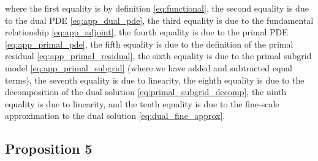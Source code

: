 %
where the first equality is by definition \eqref{eq:functional},
the second equality is due to the dual PDE
\eqref{eq:app_dual_pde}, the third equality is due to the
fundamental relationship \eqref{eq:app_adjoint},
the fourth equality is due to the primal PDE
\eqref{eq:app_primal_pde}, the fifth equality is due to
the definition of the primal residual \eqref{eq:app_primal_residual},
the sixth equality is due to the primal subgrid model
\eqref{eq:app_primal_subgrid} (where we have added and
subtracted equal terms), the seventh equality is due to
linearity, the eighth equality is due to the decomposition
of the dual solution \eqref{eq:primal_subgrid_decomp},
the ninth equality is due to linearity, and the tenth equality
is due to the fine-scale approximation to the dual solution
\eqref{eq:dual_fine_approx}.

\subsection{Proposition 5}

